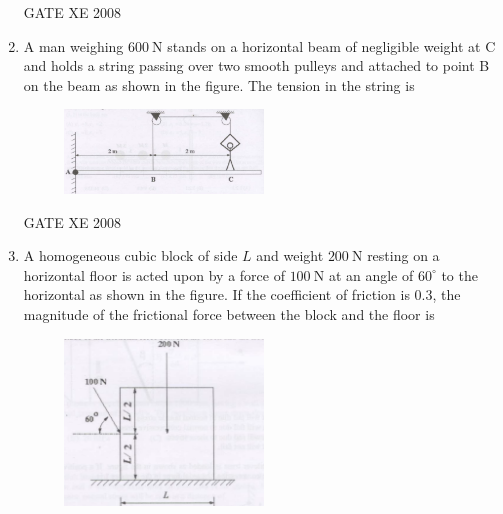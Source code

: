 \documentclass[12pt]{article}
\begin{document}
\begin{enumerate}
\begin{enumerate}
\end{enumerate}
    
    GATE XE 2008


    \item A man weighing $600 \ \mathrm{N}$ stands on a horizontal beam of negligible weight at C and holds a string passing over two smooth pulleys and attached to point B on the beam as shown in the figure. The tension in the string is

    \begin{figure}[H]
    \centering
    \includegraphics[width=0.5\textwidth]{figs/ass1_f_q17.png}
    \caption{}
    \end{figure}

\begin{enumerate}
\end{enumerate}

    GATE XE 2008

    \item A homogeneous cubic block of side $L$ and weight $200 \ \mathrm{N}$ resting on a horizontal floor is acted upon by a force of $100 \ \mathrm{N}$ at an angle of $60^{\circ}$ to the horizontal as shown in the figure. If the coefficient of friction is $0.3$, the magnitude of the frictional force between the block and the floor is

    \begin{figure}[H]
    \centering
    \includegraphics[width=0.5\textwidth]{figs/ass1_f_q18.png}
    \caption{}
    \end{figure}


\end{enumerate}
\end{document}
